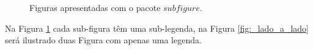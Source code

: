 \begin{figure}[H]
    \centering
    \hspace{.5cm}
    \caption{Figuras apresentadas com o pacote $subfigure$.}
    \label{fig:leon1}
\end{figure}\par
Na Figura \ref{fig:leon1} cada sub-figura têm uma sub-legenda, na Figura \ref{fig:_lado_a_lado} será ilustrado duas Figura com apenas uma legenda.
